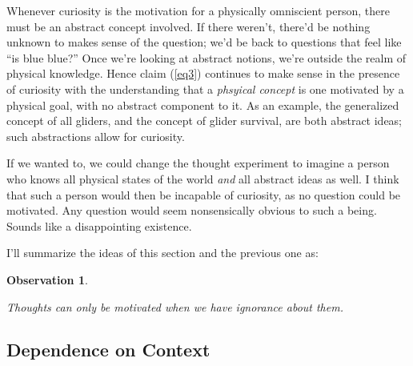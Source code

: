 \documentclass[11pt, oneside]{article}
\newtheorem{obs}{Observation}
\begin{document}
Whenever curiosity is the motivation for a physically omniscient person, there
must be an abstract concept involved. If there weren't, there'd be
nothing unknown to makes sense of the question; we'd be back to questions
that feel like
``is blue blue?''
Once we're looking at abstract
notions, we're outside the realm of physical knowledge.
Hence claim (\ref{eq3}) continues to make sense in
the presence of curiosity with the understanding that a
{\em phsyical concept} is one motivated by a physical goal, with
no abstract component to it.
As an example,
the generalized
concept of all gliders, and the concept of glider survival, are both
abstract ideas; such abstractions allow for curiosity.

If we wanted to, we could change the thought experiment to imagine a person who
knows all physical states of the world {\em and} all abstract ideas as well. I
think that such a person would then be incapable of curiosity, as no question
could be motivated. Any question would seem nonsensically obvious
to such a being. Sounds like a disappointing existence.


I'll summarize the ideas of this section and the previous one as:
\newcommand{\obsfive}{
    Thoughts can only be motivated when we have ignorance about them.
}
\begin{obs}\label{o5}
    \obsfive
\end{obs}

\subsection{Dependence on Context}
\end{document}
